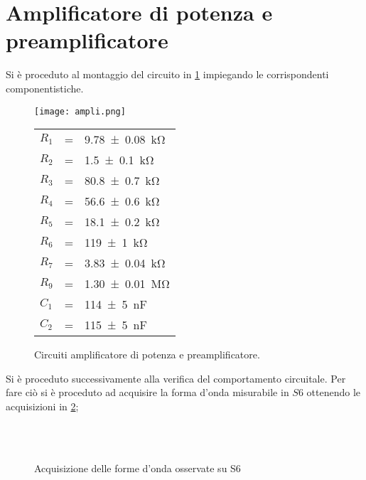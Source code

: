 \section{Amplificatore di potenza e preamplificatore}
	Si è proceduto al montaggio del circuito in \figurename{ \ref{fig:ampli}}
	impiegando le corrispondenti componentistiche.
	\begin{figure}[htb]
		\begin{minipage}{0.75\textwidth}
		\centering
		\texttt{[image: ampli.png]}
		\caption{Circuiti amplificatore di potenza e preamplificatore.}
		\label{fig:ampli}
		\end{minipage}
			\begin{minipage}{0.19\textwidth}
			\begin{tabular}{l@{ }c@{ }l}
				$R_{1}$& = &\SI{9.78\pm 0.08}{\kilo\ohm}\\
				$R_{2}$& = &\SI{1.5\pm0.1}{\kilo\ohm}\\
				$R_{3}$& = &\SI{80.8\pm0.7}{\kilo\ohm}\\
				$R_{4}$& = &\SI{56.6\pm0.6}{\kilo\ohm}\\
				$R_{5}$& = &\SI{18.1\pm0.2}{\kilo\ohm}\\
				$R_{6}$& = &\SI{119(1)}{\kilo\ohm}\\
				$R_{7}$& = &\SI{3.83\pm0.04}{\kilo\ohm}\\
				$R_{9}$& = &\SI{1.30\pm0.01}{\mega\ohm}\\
			
				
				
				$C_1$& = &\SI{114(5)}{\nano\farad}\\
				$C_2$& = &\SI{115(5)}{\nano\farad}
		\end{tabular}
		\end{minipage}
	\end{figure}
	Si è proceduto successivamente alla verifica del comportamento circuitale.
	Per fare ciò si è proceduto ad acquisire la forma d'onda misurabile in $S6$
	ottenendo le acquisizioni in \figurename{ \ref{fig:S6}};
	\begin{figure}[h]
		\centering
		\qquad
		\\
		\qquad
		\\
		\caption{Acquisizione delle forme d'onda osservate su S6}
		\label{fig:S6}
	\end{figure}
